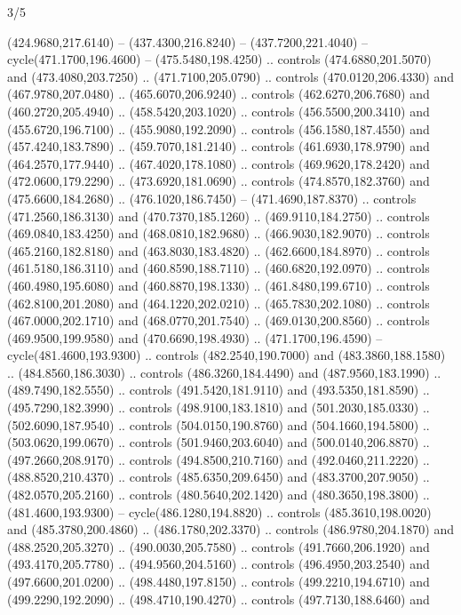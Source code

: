 \begin{flagdescription}{3/5}
\begin{scope} [xshift=0.5\flagwidth*\stretchfactor,yshift=0.5\flagwidth,scale=\flagwidth/391]
\begin{scope}[y=0.8pt, x=0.8pt, yscale=-1, xscale=1,line width=0.01\lw,shift={(-98.875,-338.125)}]
\begin{scope}[cm={{0.15382,0.0,0.0,0.15382,(34.72393,273.11413)}}]
  (424.9680,217.6140) -- (437.4300,216.8240) -- (437.7200,221.4040) --
  cycle(471.1700,196.4600) -- (475.5480,198.4250) .. controls
  (474.6880,201.5070) and (473.4080,203.7250) .. (471.7100,205.0790) .. controls
  (470.0120,206.4330) and (467.9780,207.0480) .. (465.6070,206.9240) .. controls
  (462.6270,206.7680) and (460.2720,205.4940) .. (458.5420,203.1020) .. controls
  (456.5500,200.3410) and (455.6720,196.7100) .. (455.9080,192.2090) .. controls
  (456.1580,187.4550) and (457.4240,183.7890) .. (459.7070,181.2140) .. controls
  (461.6930,178.9790) and (464.2570,177.9440) .. (467.4020,178.1080) .. controls
  (469.9620,178.2420) and (472.0600,179.2290) .. (473.6920,181.0690) .. controls
  (474.8570,182.3760) and (475.6600,184.2680) .. (476.1020,186.7450) --
  (471.4690,187.8370) .. controls (471.2560,186.3130) and (470.7370,185.1260) ..
  (469.9110,184.2750) .. controls (469.0840,183.4250) and (468.0810,182.9680) ..
  (466.9030,182.9070) .. controls (465.2160,182.8180) and (463.8030,183.4820) ..
  (462.6600,184.8970) .. controls (461.5180,186.3110) and (460.8590,188.7110) ..
  (460.6820,192.0970) .. controls (460.4980,195.6080) and (460.8870,198.1330) ..
  (461.8480,199.6710) .. controls (462.8100,201.2080) and (464.1220,202.0210) ..
  (465.7830,202.1080) .. controls (467.0000,202.1710) and (468.0770,201.7540) ..
  (469.0130,200.8560) .. controls (469.9500,199.9580) and (470.6690,198.4930) ..
  (471.1700,196.4590) -- cycle(481.4600,193.9300) .. controls
  (482.2540,190.7000) and (483.3860,188.1580) .. (484.8560,186.3030) .. controls
  (486.3260,184.4490) and (487.9560,183.1990) .. (489.7490,182.5550) .. controls
  (491.5420,181.9110) and (493.5350,181.8590) .. (495.7290,182.3990) .. controls
  (498.9100,183.1810) and (501.2030,185.0330) .. (502.6090,187.9540) .. controls
  (504.0150,190.8760) and (504.1660,194.5800) .. (503.0620,199.0670) .. controls
  (501.9460,203.6040) and (500.0140,206.8870) .. (497.2660,208.9170) .. controls
  (494.8500,210.7160) and (492.0460,211.2220) .. (488.8520,210.4370) .. controls
  (485.6350,209.6450) and (483.3700,207.9050) .. (482.0570,205.2160) .. controls
  (480.5640,202.1420) and (480.3650,198.3800) .. (481.4600,193.9300) --
  cycle(486.1280,194.8820) .. controls (485.3610,198.0020) and
  (485.3780,200.4860) .. (486.1780,202.3370) .. controls (486.9780,204.1870) and
  (488.2520,205.3270) .. (490.0030,205.7580) .. controls (491.7660,206.1920) and
  (493.4170,205.7780) .. (494.9560,204.5160) .. controls (496.4950,203.2540) and
  (497.6600,201.0200) .. (498.4480,197.8150) .. controls (499.2210,194.6710) and
  (499.2290,192.2090) .. (498.4710,190.4270) .. controls (497.7130,188.6460) and

\end{scope}
\end{scope}
\end{scope}
\end{flagdescription}

